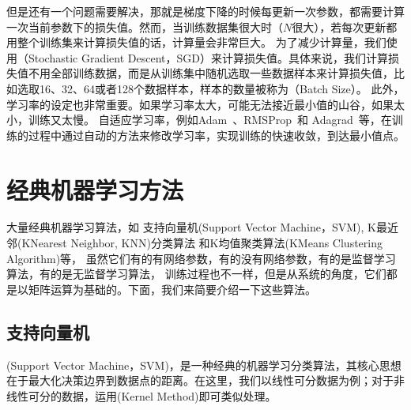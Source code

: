 \documentclass[letterpaper,10pt,english]{sphinxmanual}
\begin{document}
\sphinxAtStartPar
但是还有一个问题需要解决，那就是梯度下降的时候每更新一次参数，都需要计算一次当前参数下的损失值。然而，当训练数据集很大时（\(N\)很大），若每次更新都用整个训练集来计算损失值的话，计算量会非常巨大。
为了减少计算量，我们使用（Stochastic Gradient
Descent，SGD）来计算损失值。具体来说，我们计算损失值不用全部训练数据，而是从训练集中随机选取一些数据样本来计算损失值，比如选取16、32、64或者128个数据样本，样本的数量被称为（Batch
Size）。
此外，学习率的设定也非常重要。如果学习率太大，可能无法接近最小值的山谷，如果太小，训练又太慢。
自适应学习率，例如Adam 、RMSProp 和
Adagrad 等，在训练的过程中通过自动的方法来修改学习率，实现训练的快速收敛，到达最小值点。


\section{经典机器学习方法}
\label{\detokenize{appendix_machine_learning_introduction/classic_machine_learning:id1}}\label{\detokenize{appendix_machine_learning_introduction/classic_machine_learning::doc}}
\sphinxAtStartPar
大量经典机器学习算法，如 支持向量机(Support Vector Machine，SVM),
K最近邻(K\sphinxhyphen{}Nearest Neighbor, KNN)分类算法 和K均值聚类算法(K\sphinxhyphen{}Means
Clustering Algorithm)等，
虽然它们有的有网络参数，有的没有网络参数，有的是监督学习算法，有的是无监督学习算法，
训练过程也不一样，但是从系统的角度，它们都是以矩阵运算为基础的。下面，我们来简要介绍一下这些算法。


\subsection{支持向量机}
\label{\detokenize{appendix_machine_learning_introduction/classic_machine_learning:id2}}
\sphinxAtStartPar
{}(Support Vector
Machine，SVM)，是一种经典的机器学习分类算法，其核心思想在于最大化决策边界到数据点的距离。在这里，我们以线性可分数据为例；对于非线性可分的数据，运用(Kernel
Method)即可类似处理。
\end{document}
